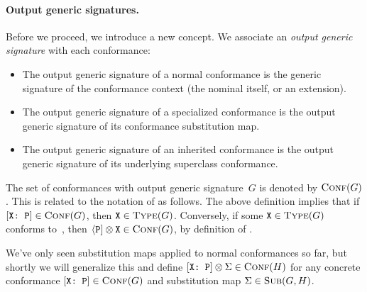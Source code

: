 \documentclass[../generics]{subfiles}
\begin{document}
\paragraph{Output generic signatures.} Before we proceed, we introduce a new concept. We associate an \emph{output generic signature} with each conformance:
\begin{itemize}
\item The output generic signature of a normal conformance is the generic signature of the conformance context (the nominal itself, or an extension).

\item The output generic signature of a specialized conformance is the output generic signature of its conformance substitution map.

\item The output generic signature of an inherited conformance is the output generic signature of its underlying superclass conformance.
\end{itemize}

The set of conformances with output generic signature~$G$ is denoted by $\textsc{Conf}({G})$. This is related to the notation of  as follows. The above definition implies that if $[\texttt{X:~P}]\in\textsc{Conf}({G})$, then $\texttt{X}\in\textsc{Type}({G})$. Conversely, if some $\texttt{X}\in\textsc{Type}({G})$ conforms to~\tP, then $\langle\texttt{P}] \otimes \texttt{X} \in \textsc{Conf}({G})$, by definition of .

We've only seen substitution maps applied to normal conformances so far, but shortly we will generalize this and define $[\texttt{X:~P}]\otimes\Sigma \in \textsc{Conf}({H})$ for any concrete conformance $[\texttt{X:~P}]\in\textsc{Conf}({G})$ and substitution map $\Sigma\in\textsc{Sub}({G, H})$.
\end{document}
